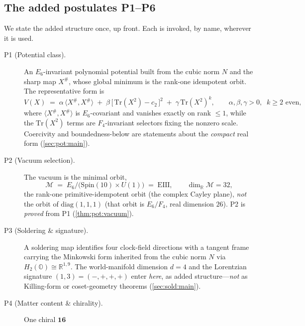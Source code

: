 \documentclass[11pt]{article}
\theoremstyle{plain}
\theoremstyle{definition}
\theoremstyle{remark}
\begin{document}
\subsection{The added postulates P1--P6}
\label{sec:intro:postulates}

We state the added structure once, up front. Each is invoked, by name, wherever
it is used.

\begin{description}
  \item[\textnormal{P1} (Potential class).] An $E_6$-invariant polynomial
    potential built from the cubic norm $N$ and the sharp map $X^{\#}$, whose
    global minimum is the rank-one idempotent orbit. The representative form is
    \begin{equation}
      V(X)\;=\;\alpha\,\langle X^{\#},X^{\#}\rangle
        \;+\;\beta\,\bigl[\,\mathrm{Tr}(X^{2})-c_2\,\bigr]^{2}
        \;+\;\gamma\,\mathrm{Tr}(X^{2})^{k},
      \qquad \alpha,\beta,\gamma>0,\;\; k\ge 2 \text{ even},
      \label{eq:intro:V}
    \end{equation}
    where $\langle X^{\#},X^{\#}\rangle$ is $E_6$-covariant and vanishes exactly
    on rank $\le 1$, while the $\mathrm{Tr}(X^2)$ terms are $F_4$-invariant
    selectors fixing the nonzero scale. Coercivity and boundedness-below are
    statements about the \emph{compact} real form (\autoref{sec:pot:main}).
  \item[\textnormal{P2} (Vacuum selection).] The vacuum is the minimal orbit,
    \begin{equation}
      \mathcal{M}\;=\;E_6/\bigl(\mathrm{Spin}(10)\times U(1)\bigr)\;=\;\mathrm{EIII},
      \qquad \dim_{\mathbb{R}}\mathcal{M}=32,
      \label{eq:intro:vacuum}
    \end{equation}
    the rank-one primitive-idempotent orbit (the complex Cayley plane), \emph{not}
    the orbit of $\mathrm{diag}(1,1,1)$ (that orbit is $E_6/F_4$, real dimension
    $26$). \textnormal{P2} is \emph{proved} from \textnormal{P1}
    (\autoref{thm:pot:vacuum}).
  \item[\textnormal{P3} (Soldering \& signature).] A soldering map identifies
    four clock-field directions with a tangent frame carrying the Minkowski form
    inherited from the cubic norm $N$ via $H_2(\mathbb{O})\cong\mathbb{R}^{1,9}$.
    The world-manifold dimension $d=4$ and the Lorentzian signature
    $(1,3)=(-,+,+,+)$ enter \emph{here}, as added structure---\emph{not} as
    Killing-form or coset-geometry theorems (\autoref{sec:sold:main}).
  \item[\textnormal{P4} (Matter content \& chirality).] One chiral $\mathbf{16}$

\end{description}
\end{document}
